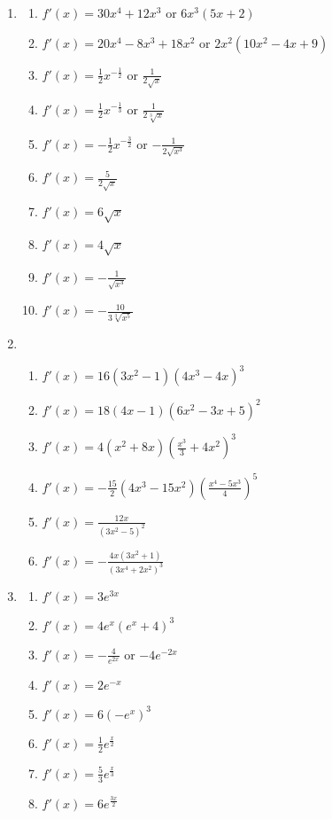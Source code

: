 \documentclass[a4paper,12pt]{article}
\begin{document}
\begin{enumerate}
\item
    \begin{multicols}{2}
    \begin{enumerate}
    \item \spacer$f'(x) = 30x^4 + 12x^3$ or $6x^3(5x + 2)$
    \item \spacer$f'(x) = 20x^4 - 8x^3 + 18x^2$ or $2x^2(10x^2 - 4x + 9)$
    \item \spacer$f'(x) = \frac{1}{2}x^{-\frac{1}{2}}$ or $\frac{1}{2\sqrt{x}}$
    \item \spacer$f'(x) = \frac{1}{2}x^{-\frac{1}{3}}$ or $\frac{1}{2\sqrt[3]{x}}$
    \item \spacer$f'(x) = -\frac{1}{2}x^{-\frac{3}{2}}$ or $-\frac{1}{2\sqrt{x^3}}$
    \item \spacer$f'(x) = \frac{5}{2\sqrt{x}}$
    \item \spacer$f'(x) = 6\sqrt{x}$
    \item \spacer$f'(x) = 4\sqrt{x}$
    \item \spacer$f'(x) = -\frac{1}{\sqrt{x^3}}$
    \item \spacer$f'(x) = -\frac{10}{3\sqrt[3]{x^5}}$
    \end{enumerate}
    \end{multicols}

\item
    \begin{enumerate}
    \item \spacer$f'(x) = 16(3x^2 - 1)(4x^3 - 4x)^3$
    \item \spacer$f'(x) = 18(4x - 1)(6x^2 - 3x + 5)^2$
    \item \spacer$f'(x) = 4(x^2 + 8x)\left(\frac{x^3}{3} + 4x^2\right)^3$
    \item \spacer$f'(x) = -\frac{15}{2}(4x^3 - 15x^2)\left(\frac{x^4 - 5x^3}{4}\right)^5$
    \item \spacer$f'(x) = \frac{12x}{(3x^2 - 5)^2}$
    \item \spacer$f'(x) = -\frac{4x(3x^2 + 1)}{(3x^4 + 2x^2)^3}$
    \end{enumerate}

\item
    \begin{multicols}{2}
    \begin{enumerate}
    \item \spacer$f'(x) = 3e^{3x}$
    \item \spacer$f'(x) = 4e^x(e^x + 4)^3$
    \item \spacer$f'(x) = -\frac{4}{e^{2x}}$ or $-4e^{-2x}$
    \item \spacer$f'(x) = 2e^{-x}$
    \item \spacer$f'(x) = 6(-e^x)^3$
    \item \spacer$f'(x) = \frac{1}{2}e^{\frac{x}{2}}$
    \item \spacer$f'(x) = \frac{5}{3}e^{\frac{x}{3}}$
    \item \spacer$f'(x) = 6e^{\frac{3x}{2}}$
    \end{enumerate}
    \end{multicols}


\end{enumerate}
\end{document}
